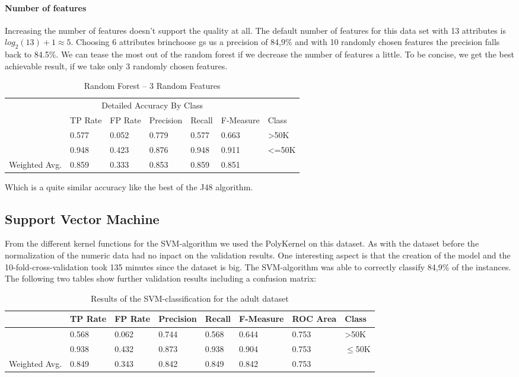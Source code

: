\documentclass[paper=a4, fontsize=11pt]{scrartcl} %
\numberwithin{equation}{section} %
\numberwithin{figure}{section} %
\numberwithin{table}{section} %
\begin{document}
\paragraph{Number of features}
Increasing the number of features doesn't support the quality at all. The default number of features for this data set with 13 attributes is $ log_2(13) + 1 \approx 5 $. Choosing 6 attributes brinchoose gs us a precision of 84,9\% and with 10 randomly chosen features the precision falls back to 84.5\%. We can tease the most out of the random forest if we decrease the number of features a little. To be concise, we get the best achievable result, if we take only 3 randomly chosen
features.
\begin{table*}[htb]\centering
  \begin{tabular*}{\columnwidth}{@{}lllllll@{}}
      \toprule 
      \multicolumn{7}{c}{Detailed Accuracy By Class} \\ 
               &  TP Rate & FP Rate & Precision & Recall & F-Measure & Class \\   \midrule
               &  0.577   & 0.052   & 0.779     & 0.577  & 0.663     & >50K  \\   
               &  0.948   & 0.423   & 0.876     & 0.948  & 0.911     & <=50K \\   
Weighted Avg.  &  0.859   & 0.333   & 0.853     & 0.859  & 0.851     &       \\   \bottomrule
    \end{tabular*}
\caption{Random Forest -- 3 Random Features} 
\label{tab:adult:rand:3f}
\end{table*}
\FloatBarrier
Which is a quite similar accuracy like the best of the J48 algorithm. 
\subsection{Support Vector Machine}

From the different kernel functions for the SVM-algorithm we used the PolyKernel on this dataset. As with the dataset before the normalization of the numeric data had no inpact on the validation results. One interesting aspect is that the creation of the model and the 10-fold-cross-validation took 135 minutes since the dataset is big. The SVM-algorithm was able to correctly classify 84,9\% of the instances. The following two tables show further validation results including a confusion matrix:

\begin{table}[h]
\centering
\begin{tabular}{|llllllll|}
	\hline
									&TP Rate   	&FP Rate   &Precision   &Recall  &F-Measure &ROC Area  	&Class\\
	\hline
									&0.568     	&0.062     &0.744     	&0.568   &0.644    	&0.753    	&	>50K\\
  								&0.938     	&0.432     &0.873     	&0.938   &0.904     &0.753    	&$\leq$50K\\
  \hline
	Weighted Avg.   & 0.849    & 0.343     &0.842   		&0.849   &0.842     & 0.753			&\\
	\hline
\end{tabular}
\caption{Results of the SVM-classification for the adult dataset}
\end{table}
\end{document}
